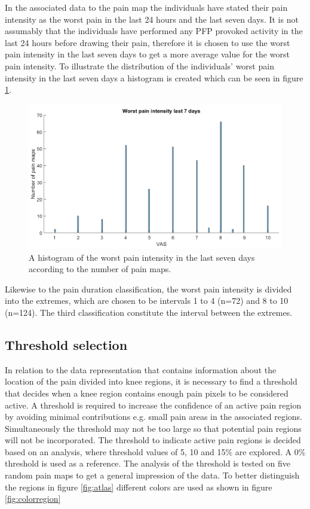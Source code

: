 \noindent
In the associated data to the pain map the individuals have stated their pain intensity as the worst pain in the last 24 hours and the last seven days.
It is not assumably that the individuals have performed any PFP provoked activity in the last 24 hours before drawing their pain, therefore it is chosen to use the worst pain intensity in the last seven days to get a more average value for the worst pain intensity.
To illustrate the distribution of the individuals’ worst pain intensity in the last seven days a histogram is created which can be seen in figure \ref{fig:histopain}.

\begin{figure} [H]
\centering
\includegraphics[width=1\textwidth]{figures/histrogramPain}
\caption{A histogram of the worst pain intensity in the last seven days according to the number of pain maps. }
\label{fig:histopain}
\end{figure}

\noindent
Likewise to the pain duration classification, the worst pain intensity is divided into the extremes, which are chosen to be intervals 1 to 4 (n=72) and 8 to 10 (n=124). The third classification constitute the interval between the extremes.


\subsection{Threshold selection}\label{sec:Selectthreshold}
In relation to the data representation that contains information about the location of the pain divided into knee regions, it is necessary to find a threshold that decides when a knee region contains enough pain pixels to be considered active. A threshold is required to increase the confidence of an active pain region by avoiding minimal contributions e.g. small pain areas in the associated regions. Simultaneously the threshold may not be too large so that potential pain regions will not be incorporated. The threshold to indicate active pain regions is decided based on an analysis, where threshold values of 5, 10 and 15\% are explored. A 0\% threshold is used as a reference. 
The analysis of the threshold is tested on five random pain maps to get a general impression of the data. To better distinguish the regions in figure \ref{fig:atlas} different colors are used as shown in figure \ref{fig:colorregion}


